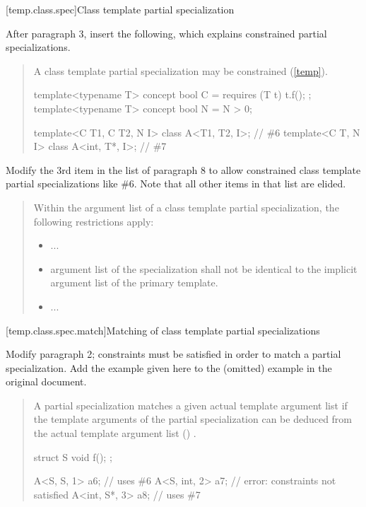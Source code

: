 [temp.class.spec]{Class template partial specialization}

After paragraph 3, insert the following, which explains constrained
partial specializations.

\begin{quote}
\setcounter{Paras}{3}
\pnum
A class template partial specialization may be constrained (\ref{temp}).
% 
\enterexample
\begin{codeblock}
template<typename T> concept bool C = requires (T t) { t.f(); };
template<typename T> concept bool N = N > 0;

template<C T1, C T2, N I> class A<T1, T2, I>;  // \#6
template<C T, N I>        class A<int, T*, I>; // \#7
\end{codeblock}
\exitexample
\end{quote}

Modify the 3rd item in the list of paragraph 8 to allow 
constrained class template partial specializations like \#6.
Note that all other items in that list are elided. 

\begin{quote}
\setcounter{Paras}{7}
\pnum
Within the argument list of a class template partial specialization, 
the following restrictions apply:
\begin{itemize}
\item...
\item{}
 argument list of the specialization shall
not be identical to the implicit argument list of the primary template.
\item...
\end{itemize}
\end{quote}


[temp.class.spec.match]{Matching of class template partial specializations}

Modify paragraph 2; constraints must be satisfied in order
to match a partial specialization. Add the example given here
to the (omitted) example in the original document.

\begin{quote}
\setcounter{Paras}{1}
\pnum
A partial specialization matches a given actual template 
argument list if the template arguments of the partial 
specialization can be deduced from the actual template argument 
list ()
.
\enterexample
\begin{codeblock}
struct S { void f(); };

A<S, S, 1>    a6; // uses \#6
A<S, int, 2>  a7; // error: constraints not satisfied
A<int, S*, 3> a8; // uses \#7
\end{codeblock}
\exitexample
\end{quote}
        

